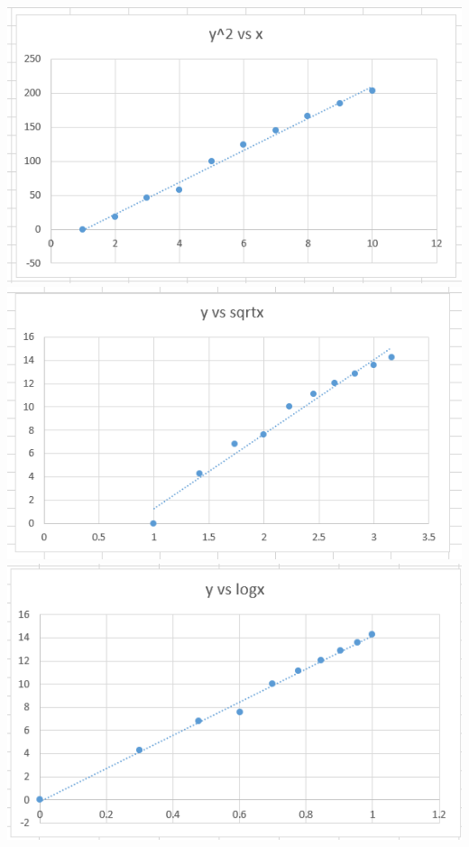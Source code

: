 \documentclass{article}
\begin{document}
\begin{enumerate}[1.]
\includegraphics{a2_q3_graph1} \\
\includegraphics{a2_q3_graph2} \\
\includegraphics{a2_q3_graph3} \\

\end{enumerate}
\end{document}
